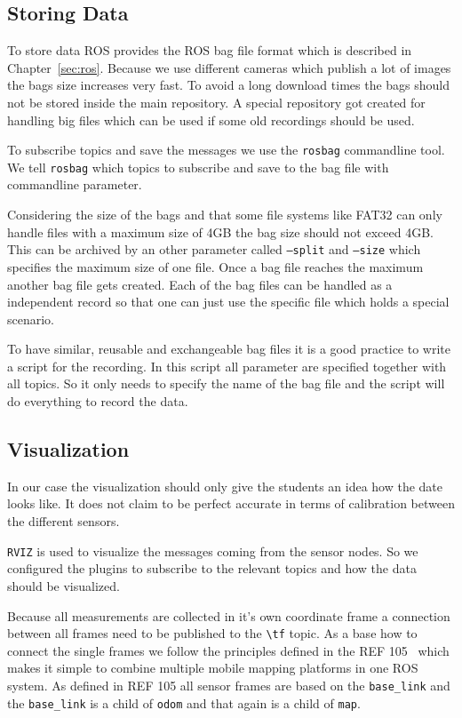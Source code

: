 \subsection{Storing Data}\label{ch:realization:ssec:storingData}

To store data \ac{ROS} provides the ROS bag file format which is described in Chapter~\ref{sec:ros}.
Because we use different cameras which publish a lot of images the bags size increases very fast.
To avoid a long download times the bags should not be stored inside the main repository.
A special repository got created for handling big files which can be used if some old recordings should be used.

To subscribe topics and save the messages we use the \texttt{rosbag} commandline tool.
We tell \texttt{rosbag} which topics to subscribe and save to the bag file with commandline parameter.

Considering the size of the bags and that some file systems like FAT32 can only handle files with a maximum size of 4GB the bag size should not exceed 4GB\@.
This can be archived by an other parameter called \texttt{--split} and \texttt{--size} which specifies the maximum size of one file.
Once a bag file reaches the maximum another bag file gets created.
Each of the bag files can be handled as a independent record so that one can just use the specific file which holds a special scenario.

To have similar, reusable and exchangeable bag files it is a good practice to write a script for the recording.
In this script all parameter are specified together with all topics.
So it only needs to specify the name of the bag file and the script will do everything to record the data.

\subsection{Visualization}\label{ch:realization:ssec:visualization}

In our case the visualization should only give the students an idea how the date looks like.
It does not claim to be perfect accurate in terms of calibration between the different sensors.

\texttt{RVIZ} is used to visualize the messages coming from the sensor nodes.
So we configured the plugins to subscribe to the relevant topics and how the data should be visualized.

Because all measurements are collected in it's own coordinate frame a connection between all frames need to be published to the \texttt{\textbackslash tf} topic.
As a base how to connect the single frames we follow the principles defined in the REF 105~\cite{rosFrames} which makes it simple to combine multiple mobile mapping platforms in one ROS system.
As defined in REF 105 all sensor frames are based on the \texttt{base\_link} and the \texttt{base\_link} is a child of \texttt{odom} and that again is a child of \texttt{map}.

